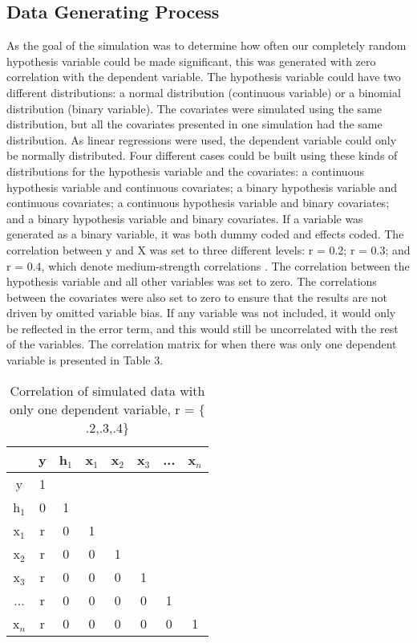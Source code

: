\subsection{Data Generating Process}
As the goal of the simulation was to determine how often our completely random hypothesis variable could be made significant, this was generated with zero correlation with the dependent variable. The hypothesis variable could have two different distributions: a normal distribution (continuous variable) or a binomial distribution (binary variable). The covariates were simulated using the same distribution, but all the covariates presented in one simulation had the same distribution. As linear regressions were used, the dependent variable could only be normally distributed. Four different cases could be built using these kinds of distributions for the hypothesis variable and the covariates: a continuous hypothesis variable and continuous covariates; a binary hypothesis variable and continuous covariates; a continuous hypothesis variable and binary covariates; and a binary hypothesis variable and binary covariates. If a variable was generated as a binary variable, it was both dummy coded and effects coded.
The correlation between y and X was set to three different levels: r = 0.2; r = 0.3; and r = 0.4, which denote medium-strength correlations \citep{Cohen1989}. The correlation between the hypothesis variable and all other variables was set to zero. The correlations between the covariates were also set to zero to ensure that the results are not driven by omitted variable bias. If any variable was not included, it would only be reflected in the error term, and this would still be uncorrelated with the rest of the variables. The correlation matrix for when there was only one dependent variable is presented in Table 3. \\

\begin{table}
\caption{}
\centering
\caption*{\footnotesize Correlation of simulated data with only one dependent variable, r = $\{$.2,.3,.4$\}$}
\begin{tabular}{c|ccccccc} 
\toprule
 & y & h${}_{1}$ & x${}_{1}$ & x${}_{2}$ & x${}_{3}$ & ... & x${}_{n}$ \\ 
 \midrule
y & 1 &  &  &  &  &  &  \\ 
h${}_{1}$ & 0 & 1 &  &  &  &  &  \\ 
x${}_{1}$ & r & 0 & 1 &  &  &  &  \\  
x${}_{2}$ & r & 0 & 0 & 1 &  &  &  \\  
x${}_{3}$ & r & 0 & 0 & 0 & 1 &  &  \\  
... & r & 0 & 0 & 0 & 0 & 1 &  \\ 
x${}_{n}$ & r & 0 & 0 & 0 & 0 & 0 & 1 \\ 
\bottomrule
\end{tabular}
\end{table}


